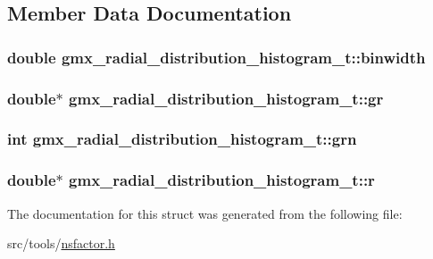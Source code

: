 \subsection{\-Member \-Data \-Documentation}
\hypertarget{structgmx__radial__distribution__histogram__t_aabf444f8dcb7714c98c248387aefa08b}{
\subsubsection[{binwidth}]{\setlength{\rightskip}{0pt plus 5cm}double {\bf gmx\-\_\-radial\-\_\-distribution\-\_\-histogram\-\_\-t\-::binwidth}}}\label{structgmx__radial__distribution__histogram__t_aabf444f8dcb7714c98c248387aefa08b}
\hypertarget{structgmx__radial__distribution__histogram__t_a946e8fc3c84a66fa48200c9a8acc260d}{
\subsubsection[{gr}]{\setlength{\rightskip}{0pt plus 5cm}double$\ast$ {\bf gmx\-\_\-radial\-\_\-distribution\-\_\-histogram\-\_\-t\-::gr}}}\label{structgmx__radial__distribution__histogram__t_a946e8fc3c84a66fa48200c9a8acc260d}
\hypertarget{structgmx__radial__distribution__histogram__t_a5ba2debd5f5f792b326e25e1e2b91aae}{
\subsubsection[{grn}]{\setlength{\rightskip}{0pt plus 5cm}int {\bf gmx\-\_\-radial\-\_\-distribution\-\_\-histogram\-\_\-t\-::grn}}}\label{structgmx__radial__distribution__histogram__t_a5ba2debd5f5f792b326e25e1e2b91aae}
\hypertarget{structgmx__radial__distribution__histogram__t_aa389812a0f8d42b5dbd5e940d7d0158e}{
\subsubsection[{r}]{\setlength{\rightskip}{0pt plus 5cm}double$\ast$ {\bf gmx\-\_\-radial\-\_\-distribution\-\_\-histogram\-\_\-t\-::r}}}\label{structgmx__radial__distribution__histogram__t_aa389812a0f8d42b5dbd5e940d7d0158e}


\-The documentation for this struct was generated from the following file\-:\begin{DoxyCompactItemize}
\item 
src/tools/\hyperlink{nsfactor_8h}{nsfactor.\-h}\end{DoxyCompactItemize}
